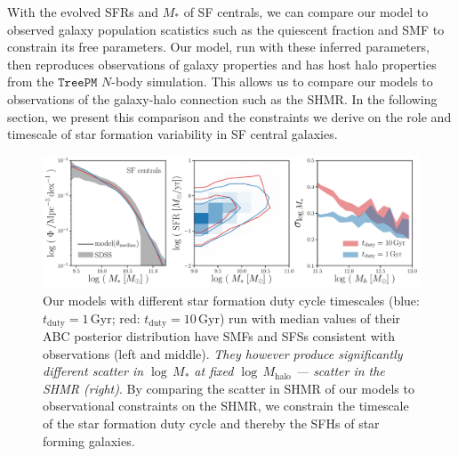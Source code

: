 \documentclass[12pt, letterpaper, preprint, tighten]{aastex62}
\begin{document}
With the evolved SFRs and $M_*$ of SF centrals, we can compare our model 
to observed galaxy population scatistics such as the quiescent fraction 
and SMF to constrain its free parameters. Our model, run with these 
inferred parameters, then reproduces observations of galaxy properties 
and has host halo properties from the $\mathtt{TreePM}$ $N$-body simulation. 
This allows us to compare our models to observations of the galaxy-halo 
connection such as the SHMR. In the following section, we present this 
comparison and the constraints we derive on the role and timescale of 
star formation variability in SF central galaxies.

\begin{figure}
\begin{center}
\includegraphics[width=\textwidth]{figs/qaplot_abc.pdf}
    \caption{Our models with different star formation duty cycle timescales 
    (blue: $t_\mathrm{duty}{=}1\,\mathrm{Gyr}$; red: $t_\mathrm{duty}{=}10\,\mathrm{Gyr}$) 
    run with median values of their ABC posterior distribution have SMFs and SFSs consistent 
    with observations (left and middle). \emph{They however produce significantly different 
    scatter in $\log\,M_*$ at fixed $\log\,M_\mathrm{halo}$ --- scatter in the SHMR (right)}. 
    By comparing the scatter in SHMR of our models to observational constraints on the SHMR, 
    we constrain the timescale of the star formation duty cycle and thereby the SFHs of star 
    forming galaxies.
    }
\label{fig:abc_demo}
\end{center}
\end{figure}
\end{document}
